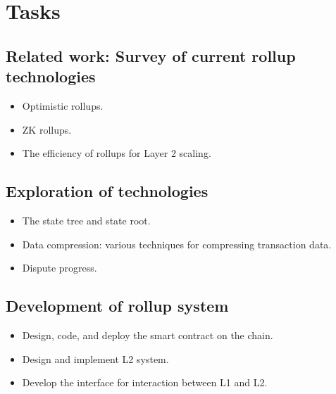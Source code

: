 \documentclass{article}
\begin{document}


\section{Tasks}
\subsection{Related work: Survey of current rollup technologies}
\begin{itemize} 
\item Optimistic rollups. 
\item ZK rollups. 
\item The efficiency of rollups for Layer 2 scaling.
\end{itemize}
\subsection{Exploration of technologies}
\begin{itemize} 
\item The state tree and state root. 
\item Data compression: various techniques for compressing transaction data. 
\item Dispute progress.
\end{itemize}
\subsection{Development of rollup system}
\begin{itemize} 
\item Design, code, and deploy the smart contract on the chain. 
\item Design and implement L2 system. 
\item Develop the interface for interaction between L1 and L2.
\end{itemize}
\end{document}
